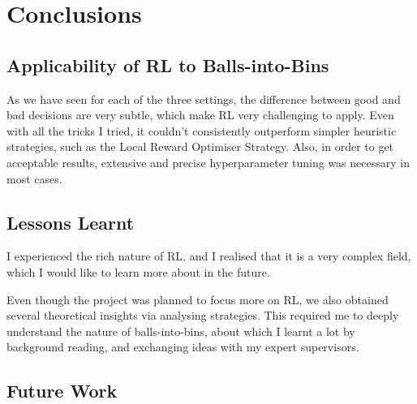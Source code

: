 
\chapter{Conclusions}\label{conclusion}

\ifpdf
    \graphicspath{{Chapter3/Figs/Raster/}{Chapter3/Figs/PDF/}{Chapter3/Figs/}}
\else
    \graphicspath{{Chapter3/Figs/Vector/}{Chapter3/Figs/}}
\fi



\section{Applicability of RL to Balls-into-Bins}


As we have seen for each of the three settings, the difference between good and bad decisions are very subtle, which make RL very challenging to apply. Even with all the tricks I tried, it couldn't consistently outperform simpler heuristic strategies, such as the Local Reward Optimiser Strategy. Also, in order to get acceptable results, extensive and precise hyperparameter tuning was necessary in most cases. 



\section{Lessons Learnt}

I experienced the rich nature of RL, and I realised that it is a very complex field, which I would like to learn more about in the future. 

Even though the project was planned to focus more on RL, we also obtained several theoretical insights via analysing strategies. This required me to deeply understand the nature of balls-into-bins, about which I learnt a lot by background reading, and exchanging ideas with my expert supervisors. 

\section{Future Work}

